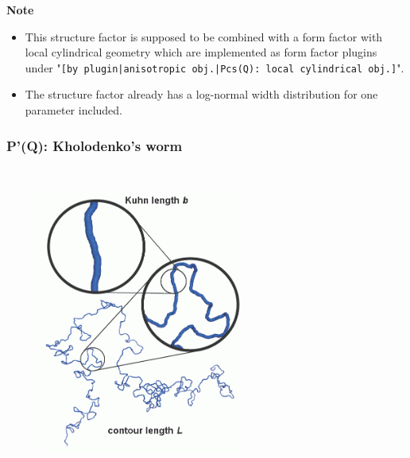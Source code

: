 \noindent
\textbf{Note}
\begin{itemize}
  \item This structure factor is supposed to be combined with a form factor with local cylindrical geometry which are implemented as form factor plugins
under "\texttt{[by plugin|anisotropic obj.|Pcs(Q): local cylindrical obj.]}".
\item The structure factor already has a log-normal width distribution for one parameter included.
\end{itemize}

\clearpage
\subsubsection{P'(Q): Kholodenko's worm} ~\\
\label{plugin:Pprime4kohlodenko}

\begin{figure}[htb]
\begin{center}
\includegraphics[width=0.617\textwidth,height=0.762\textwidth]{SemiflexiblePolymerTxt.png}
\end{center}
\caption{}
\label{fig:Pprime4KholodenkoWorm}
\end{figure}

